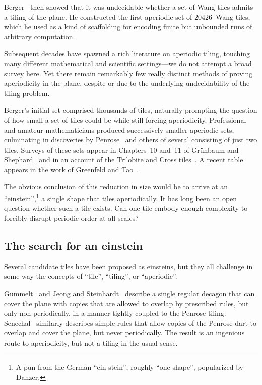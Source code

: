 Berger~\cite{Berger} then showed that it was undecidable whether a set
of Wang tiles admits a tiling of the plane. He 
constructed the first aperiodic set of  $20426$~Wang tiles, which he used 
as a kind of scaffolding for encoding finite but unbounded runs of arbitrary computation.

Subsequent decades have spawned a rich literature on aperiodic tiling, touching many  different mathematical and scientific settings---we do not attempt a broad survey here. Yet there remain remarkably few really distinct methods of proving aperiodicity in the plane, despite or due to the underlying undecidability of the tiling problem. 

Berger's initial set comprised thousands of tiles, naturally prompting
the question of how small a set of tiles could be while still forcing
aperiodicity.   
Professional and amateur mathematicians produced successively smaller aperiodic sets, culminating in discoveries by Penrose~\cite{Penrose}
and others of several consisting of just two tiles.  Surveys of these 
sets appear in Chapters~10 and~11 of Gr\"unbaum and Shephard~\cite{GS} and
in an account of the Trilobite and Cross tiles~\cite{ChaimTC}.
A recent table appears in the work of Greenfeld and Tao~\cite{GT1}.

The obvious conclusion of this reduction in size would be to arrive at 
an ``einstein'',\!\footnote{A pun from the German ``ein stein'', roughly ``one 
shape'', popularized by Danzer.} a single shape that tiles aperiodically. 
It has long been an open question whether such a tile exists.  Can one tile 
embody enough complexity to forcibly disrupt  periodic order at all scales?

\subsection{The search for an einstein}

Several candidate tiles have been proposed as einsteins, but they all challenge in some way the concepts
of ``tile'', ``tiling'', or ``aperiodic''.

Gummelt~\cite{Gummelt} and Jeong and Steinhardt~\cite{SteinhardtJeong,JeongSteinhardt}
describe a single regular decagon that can cover the plane with copies that are allowed to overlap by prescribed rules, but only non-periodically, in a manner tightly coupled to the Penrose tiling. 
Senechal~\cite{Senechalpersonalcommunication} similarly describes simple rules that allow copies of the Penrose dart to overlap and cover the plane, but never periodically. The result is an ingenious route to aperiodicity, but not a 
tiling in the usual sense.

